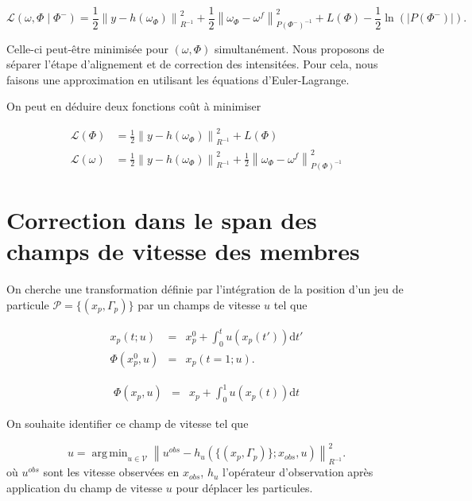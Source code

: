 \documentclass{article}
\DeclareMathOperator*{\argmin}{arg\,min}
\newcommand{\norm}[1]{\left\lVert #1 \right\rVert}
\begin{document}
\begin{equation*}
    \mathcal L(\omega, \Phi \mid \Phi^-) = \frac{1}{2}\norm{y - h(\omega_\Phi)}^2_{R^{-1}} + \frac{1}{2} \norm{\omega_{\Phi} - \omega^f}^2_{P(\Phi^-)^{-1}} + L(\Phi) - \frac{1}{2} \ln(|P(\Phi^-)|).
\end{equation*}

Celle-ci peut-être minimisée pour $(\omega, \Phi)$ simultanément. Nous proposons de séparer l'étape d'alignement et de correction des intensitées. Pour cela, nous faisons une approximation en utilisant les équations d'Euler-Lagrange.

On peut en déduire deux fonctions coût à minimiser

\begin{align*}
    \mathcal L(\Phi)   & =  \frac{1}{2}\norm{y - h(\omega_\Phi)}^2_{R^{-1}} + L(\Phi)                                                      \\
    \mathcal L(\omega) & =  \frac{1}{2}\norm{y - h(\omega_\Phi)}^2_{R^{-1}} + \frac{1}{2} \norm{\omega_{\Phi} - \omega^f}^2_{P(\Phi)^{-1}}
\end{align*}

\section{Correction dans le span des champs de vitesse des membres}

On cherche une transformation définie par l'intégration de la position d'un jeu de particule $\mathcal P = \{(x_p, \Gamma_p)\}$ par un champs de vitesse $u$ tel que

\begin{eqnarray*}
    x_p(t;u) &=& x_p^0 + \int_{0}^{t} u(x_p(t')) \mathrm dt' \\
    \Phi(x_p^0, u) &=& x_p(t=1; u).
\end{eqnarray*}

\begin{eqnarray*}
    \Phi(x_p, u)  &=& x_p + \int_{0}^{1} u(x_p(t)) \mathrm dt
\end{eqnarray*}

On souhaite identifier ce champ de vitesse tel que

\begin{equation*}
    u = \argmin_{u \in \mathcal{V}} \norm{u^{obs} - h_u(\{(x_p, \Gamma_p)\}; x_{obs}, u)}^2_{R^{-1}}.
\end{equation*}où $u^{obs}$ sont les vitesse observées en $x_{obs}$, $h_u$ l'opérateur d'observation après application du champ de vitesse $u$ pour déplacer les particules.
\end{document}
